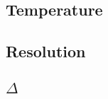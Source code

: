 \documentclass[a4paper]{article}
\begin{document}
		\subsection{Temperature}
			\begin{figure}[ht]
				\centering
				
			\end{figure}
		\subsection{Resolution}
			\begin{figure}[ht]
				\centering
				
			\end{figure}
		\subsection{$\Delta$}
			\begin{figure}[ht]
				\centering
				
			\end{figure}
	
	
\end{document}
